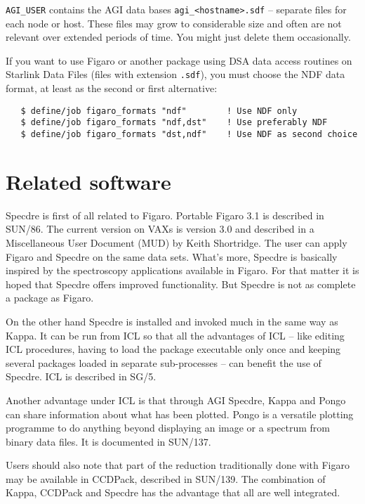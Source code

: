 {\tt AGI\_USER} contains the AGI data bases {\tt agi\_<hostname>.sdf} --
separate files for each node or host. These files may grow to
considerable size and often are not relevant over extended periods of
time.  You might just delete them occasionally.

If you want to use Figaro or another package using DSA data access
routines on Starlink Data Files (files with extension {\tt .sdf}), you
must choose the NDF data format, at least as the second or first
alternative:

\begin{verbatim}
   $ define/job figaro_formats "ndf"        ! Use NDF only
   $ define/job figaro_formats "ndf,dst"    ! Use preferably NDF
   $ define/job figaro_formats "dst,ndf"    ! Use NDF as second choice
\end{verbatim}


\goodbreak
\section{Related software}
\label{related}

Specdre is first of all related to Figaro.  Portable Figaro 3.1 is
described in SUN/86.  The current version on VAXs is version 3.0 and
described in a Miscellaneous User Document (MUD) by Keith Shortridge.
The user can apply Figaro and Specdre on the same data sets. What's
more, Specdre is basically inspired by the spectroscopy applications
available in Figaro. For that matter it is hoped that Specdre offers
improved functionality. But Specdre is not as complete a package as
Figaro.

On the other hand Specdre is installed and invoked much in the same way as
Kappa. It can be run from ICL so that all the advantages of ICL -- like editing
ICL procedures, having to load the package executable only once and keeping
several packages loaded in separate sub-processes -- can benefit the use of
Specdre. ICL is described in SG/5.

Another advantage under ICL is that through AGI Specdre, Kappa and Pongo
can share information about what has been plotted.  Pongo is a versatile
plotting programme to do anything beyond displaying an image or a
spectrum from binary data files.  It is documented in SUN/137.

Users should also note that part of the reduction traditionally done with
Figaro may be available in CCDPack, described in SUN/139. The combination of
Kappa, CCDPack and Specdre has the advantage that all are well integrated.

